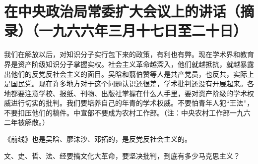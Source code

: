 \section[在中央政治局常委扩大会议上的讲话（摘录）（一九六六年三月十七日至二十日）]{在中央政治局常委扩大会议上的讲话（摘录）（一九六六年三月十七日至二十日）}


我们在解放以后，对知识分子实行包下来的政策，有利也有弊。现在学术界和教育界是资产阶级知识分子掌握实权。社会主义革命越深入，他们就越抵抗，就越暴露出他们的反党反社会主义的面目。吴晗和翦伯赞等人是共产党员，也反共，实际上是国民党。现在许多地方对于这个问题认识还很差，学术批判还没有开展起来。各地都要注意学校、报纸、刊物、出版社掌握在什么人手里，要对资产阶级的学术权威进行切实的批判。我们要培养自己的年青的学术权威。不要怕青年人犯“王法”，不要扣压他们的稿件。中宣部不要成为农村工作部。（注：中央农村工作部一九六二年被解散。）

《前线》也是吴晗、廖沬沙、邓拓的，是反党反社会主义的。

文、史、哲、法、经要搞文化大革命，要坚决批判，到底有多少马克思主义？



